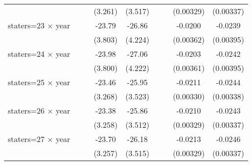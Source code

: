 {\begin{longtable}{l*{8}{c}}
                    &                     &                     &     (3.261)         &     (3.517)         &                     &                     &   (0.00329)         &   (0.00337)         \\
[1em]
staters=23 $\times$ year&                     &                     &      -23.79\sym{***}&      -26.86\sym{***}&                     &                     &     -0.0200\sym{***}&     -0.0239\sym{***}\\
                    &                     &                     &     (3.803)         &     (4.224)         &                     &                     &   (0.00362)         &   (0.00395)         \\
[1em]
staters=24 $\times$ year&                     &                     &      -23.98\sym{***}&      -27.06\sym{***}&                     &                     &     -0.0203\sym{***}&     -0.0242\sym{***}\\
                    &                     &                     &     (3.800)         &     (4.222)         &                     &                     &   (0.00361)         &   (0.00395)         \\
[1em]
staters=25 $\times$ year&                     &                     &      -23.46\sym{***}&      -25.95\sym{***}&                     &                     &     -0.0211\sym{***}&     -0.0244\sym{***}\\
                    &                     &                     &     (3.268)         &     (3.523)         &                     &                     &   (0.00330)         &   (0.00338)         \\
[1em]
staters=26 $\times$ year&                     &                     &      -23.38\sym{***}&      -25.86\sym{***}&                     &                     &     -0.0210\sym{***}&     -0.0243\sym{***}\\
                    &                     &                     &     (3.258)         &     (3.512)         &                     &                     &   (0.00329)         &   (0.00337)         \\
[1em]
staters=27 $\times$ year&                     &                     &      -23.70\sym{***}&      -26.18\sym{***}&                     &                     &     -0.0213\sym{***}&     -0.0246\sym{***}\\
                    &                     &                     &     (3.257)         &     (3.515)         &                     &                     &   (0.00329)         &   (0.00337)         \\

\end{longtable}}
